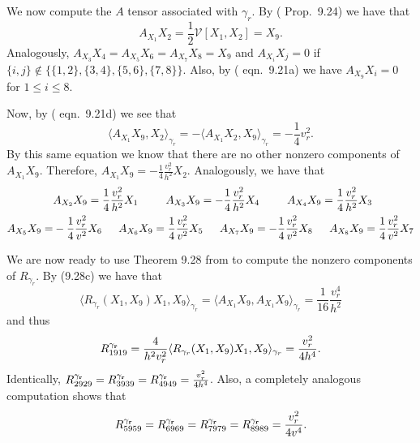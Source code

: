\documentclass[10pt]{amsart}
\def\nin{\not \in}
\def\g{\gamma}
\def\la{\langle}
\def\ra{\rangle}
\theoremstyle{definition}
\theoremstyle{remark}
\numberwithin{equation}{section}
\begin{document}
We now compute the $A$ tensor associated with $\g_r$.
By (\cite{Besse} Prop.\ 9.24) we have that
	\begin{equation*}
	A_{X_1}X_2 = \frac{1}{2} \mathscr{V} [X_1,X_2] =  X_9.
	\end{equation*}
Analogously, $A_{X_3}X_4 = A_{X_5}X_6 = A_{X_7}X_8 =  X_9$ and $A_{X_i}X_j = 0$ if $\{ i, j \} \nin \{ \{1, 2 \}, \{ 3, 4 \}, \{5, 6\}, \{7, 8 \} \}$.  
Also, by (\cite{Besse} eqn.\ 9.21a) we have $A_{X_9}X_i = 0$ for $1 \leq i \leq 8$.  

Now, by (\cite{Besse} eqn.\ 9.21d) we see that
	\begin{equation*}
	\la A_{X_1}X_9, X_2 \ra_{\g_r} = - \la A_{X_1}X_2, X_9 \ra_{\g_r} = - \frac{1}{4} v_r^2.
	\end{equation*}
By this same equation we know that there are no other nonzero components of $A_{X_1}X_9$.  
Therefore, $A_{X_1}X_9 = - \frac{1}{4} \frac{v_r^2}{h^2} X_2$.  
Analogously, we have that
	\begin{align*}
	&A_{X_2}X_9 = \frac{1}{4} \frac{v_r^2}{h^2} X_1	\hskip 25pt	A_{X_3}X_9 = - \frac{1}{4} \frac{v_r^2}{h^2} X_4	\hskip 25pt	A_{X_4}X_9 = \frac{1}{4} \frac{v_r^2}{h^2} X_3  \\
	A_{X_5}X_9 = &- \frac{1}{4} \frac{v_r^2}{v^2} X_6	\hskip 15pt	A_{X_6}X_9 = \frac{1}{4} \frac{v_r^2}{v^2} X_5 	\hskip 15pt	A_{X_7}X_9 = - \frac{1}{4} \frac{v_r^2}{v^2} X_8	\hskip 15pt	A_{X_8}X_9 = \frac{1}{4} \frac{v_r^2}{v^2} X_7	
	\end{align*}
	
We are now ready to use Theorem 9.28 from \cite{Besse} to compute the nonzero components of $R_{\g_r}$.  
By (9.28c) we have that
	\begin{equation*}
	\la R_{\g_r}(X_1,X_9)X_1,X_9 \ra_{\g_r} = \la A_{X_1}X_9,A_{X_1}X_9 \ra_{\g_r} = \frac{1}{16} \frac{v_r^4}{h^2}
	\end{equation*}
and thus
	\begin{equation}\label{eqn:first eqn}
	R^{\bf \g_r}_{1919} = \frac{4}{h^2 v_r^2} \la R_{\g_r}(X_1,X_9)X_1,X_9 \ra_{\g_r} = \frac{v_r^2}{4 h^4}.
	\end{equation}
Identically, $R^{\bf \g_r}_{2929} = R^{\bf \g_r}_{3939} = R^{\bf \g_r}_{4949} = \frac{v_r^2}{4h^4}$.  
Also, a completely analogous computation shows that 
	\begin{equation}
	R^{\bf \g_r}_{5959} = R^{\bf \g_r}_{6969} = R^{\bf \g_r}_{7979} = R^{\bf \g_r}_{8989} = \frac{v_r^2}{4v^4}.
	\end{equation}  
	
\end{document}
